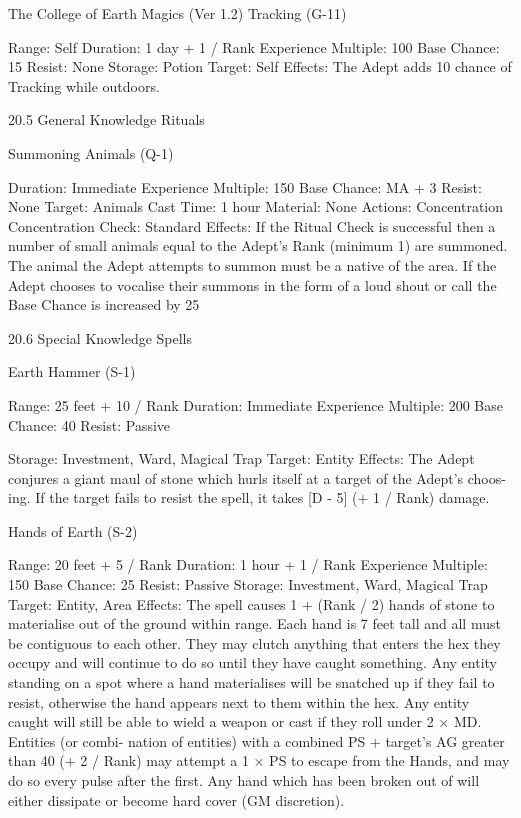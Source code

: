 \begin{Chapter}{The College of Earth Magics (Ver 1.2)}
Tracking (G-11) 

Range: Self 
Duration: 1 day + 1 / Rank 
Experience Multiple: 100 
Base Chance: 15%
Resist: None 
Storage: Potion 
Target: Self 
Effects: The Adept adds 10%
chance of Tracking while outdoors. 

20.5 General Knowledge Rituals 

Summoning Animals (Q-1) 

Duration: Immediate 
Experience Multiple: 150 
Base Chance: MA + 3%
Resist: None 
Target: Animals 
Cast Time: 1 hour 
Material: None 
Actions: Concentration 
Concentration Check: Standard 
Effects:  If  the  Ritual  Check  is  successful  then  a 
number of small animals equal to the Adept’s Rank 
(minimum 1) are summoned. The animal the Adept 
attempts to summon must be a native of the area. If 
the Adept chooses to vocalise their summons in the 
form  of  a  loud  shout  or  call  the  Base  Chance  is 
increased by 25%

20.6 Special Knowledge Spells 

Earth Hammer (S-1) 

Range: 25 feet + 10 / Rank 
Duration: Immediate 
Experience Multiple: 200 
Base Chance: 40%
Resist: Passive 

Storage: Investment, Ward, Magical Trap 
Target: Entity 
Effects:  The  Adept  conjures  a  giant  maul  of  stone 
which hurls itself at a target of the Adept’s choos-
ing. If the target fails to resist the spell, it takes [D - 
5] (+ 1 / Rank) damage. 

Hands of Earth (S-2) 

Range: 20 feet + 5 / Rank 
Duration: 1 hour + 1 / Rank 
Experience Multiple: 150 
Base Chance: 25%
Resist: Passive 
Storage: Investment, Ward, Magical Trap 
Target: Entity, Area 
Effects:  The  spell  causes  1  +  (Rank  /  2)  hands  of 
stone to materialise out of the ground within range. 
Each hand is 7 feet tall and all must be contiguous 
to each other. They may clutch anything that enters 
the  hex  they  occupy  and  will  continue  to  do  so 
until  they  have  caught  something.  Any  entity 
standing  on  a  spot  where  a  hand  materialises  will 
be  snatched  up  if  they  fail  to  resist,  otherwise  the 
hand  appears  next  to  them  within  the  hex.  Any 
entity caught will still be able to wield a weapon or 
cast if they roll under 2 × MD. Entities (or combi-
nation  of  entities)  with  a  combined  PS  +  target’s 
AG greater than 40 (+ 2 / Rank) may attempt a 1 × 
PS to escape from the Hands, and may do so every 
pulse  after  the  first.  Any  hand  which  has  been 
broken  out  of  will  either  dissipate  or  become  hard 
cover (GM discretion). 


\end{Chapter}
